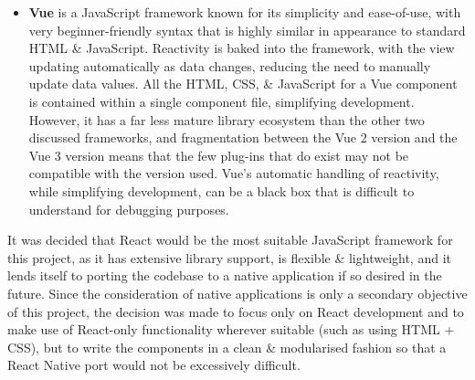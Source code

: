 \documentclass[a4paper,11pt]{report}
\begin{document}
\begin{itemize}
    \item   \textbf{Vue}\supercite{vue} is a JavaScript framework known for its simplicity and ease-of-use, with very beginner-friendly syntax that is highly similar in appearance to standard HTML \& JavaScript.
            Reactivity is baked into the framework, with the view updating automatically as data changes, reducing the need to manually update data values.
            All the HTML, CSS, \& JavaScript for a Vue component is contained within a single component file, simplifying development.
            However, it has a far less mature library ecosystem than the other two discussed frameworks, and fragmentation between the Vue 2 version and the Vue 3 version means that the few plug-ins that do exist may not be compatible with the version used.
            Vue's automatic handling of reactivity, while simplifying development, can be a black box that is difficult to understand for debugging purposes.
\end{itemize}

It was decided that React would be the most suitable JavaScript framework for this project, as it has extensive library support, is flexible \& lightweight, and it lends itself to porting the codebase to a native application if so desired in the future.
Since the consideration of native applications is only a secondary objective of this project, the decision was made to focus only on React development and to make use of React-only functionality wherever suitable (such as using HTML + CSS), but to write the components in a clean \& modularised fashion so that a React Native port would not be excessively difficult.
\end{document}
